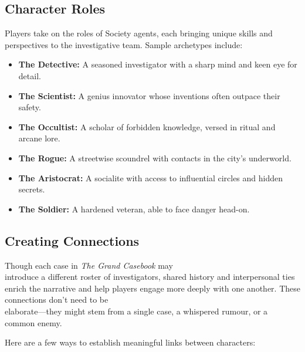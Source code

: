\subsection{Character Roles}

Players take on the roles of Society agents, each bringing unique skills and perspectives to the investigative team. Sample archetypes include:

\begin{itemize}\raggedright
    \item \textbf{The Detective:} A seasoned investigator with a sharp mind and keen eye for detail.
    \item \textbf{The Scientist:} A genius innovator whose inventions often outpace their safety.
    \item \textbf{The Occultist:} A scholar of forbidden knowledge, versed in ritual and arcane lore.
    \item \textbf{The Rogue:} A streetwise scoundrel with contacts in the city’s underworld.
    \item \textbf{The Aristocrat:} A socialite with access to influential circles and hidden secrets.
    \item \textbf{The Soldier:} A hardened veteran, able to face danger head-on.
\end{itemize}

\subsection{Creating Connections}

Though each case in \textit{The Grand Casebook} may\\ introduce a different roster of investigators, shared history and interpersonal ties enrich the narrative and help players engage more deeply with one another. These connections don't need to be\\ elaborate—they might stem from a single case, a whispered rumour, or a common enemy.

Here are a few ways to establish meaningful links between characters:

